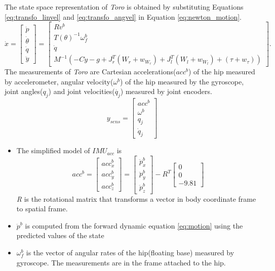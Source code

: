  The state space representation of \emph{Toro} is obtained by substituting Equations \ref{eq:transfo_linvel} and \ref{eq:transfo_angvel} in Equation \ref{eq:newton_motion}. 
\begin{equation}
\label{eq:toro}
	\dot{x} = 
	\begin{bmatrix}
	\dot{p} \\ \dot{\theta} \\ \dot{q} \\ \ddot{y}
	\end{bmatrix}
	=
	\begin{bmatrix}
	R v^b\\	
	T(\theta)^{-1} \omega_f^b \\
	\dot{q}\\
	M^{-1}(-C\dot{y} - g + J_r^{T}(W_{r}+w_{W_r}) +J_l^{T}(W_{l}+w_{W_l}) + (\tau+w_\tau))	
	\end{bmatrix}.
\end{equation}
The measurements of \emph{Toro} are Cartesian accelerations($acc^b$) of the hip measured by accelerometer, angular velocity($\omega^b$) of the hip measured by the gyroscope, joint angles($q_j$) and joint velocities($\dot{q_j}$) measured by joint encoders.
\begin{equation}
    \label{eq:y_sens}
     y_{sens} = \begin{bmatrix} acc^b \\ \omega^b \\ q_j \\ \dot{q}_j \end{bmatrix} 
\end{equation}
\begin{itemize}
    \item The simplified model of $IMU_{acc}$ is $$ acc^b= \begin{bmatrix} acc^b_x \\ acc^b_y \\ acc^b_z \end{bmatrix} =  \begin{bmatrix}\ddot{p}_x^b \\ \ddot{p}_y^b \\ \ddot{p}_z^b \end{bmatrix} - R^T \begin{bmatrix}0 \\0 \\-9.81 \end{bmatrix}$$ \emph{R} is the rotational matrix that transforms a vector in body coordinate frame to spatial frame.
    \item $\ddot{p}^b$ is computed from the forward dynamic equation \ref{eq:motion} using the predicted values of the state
    \item $\omega_{f}^{b} $ is the vector of angular rates of the hip(floating base) measured by gyroscope. The measurements are in the frame attached to the hip. 
\end{itemize}
